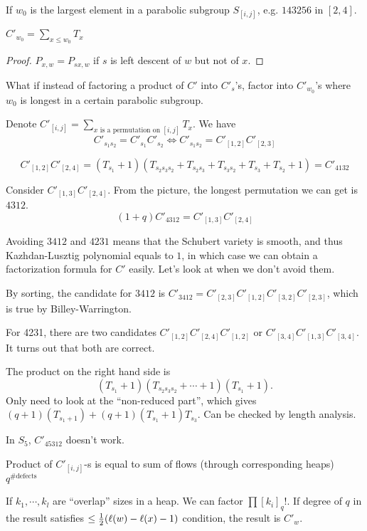 If $w_0$ is the largest element in a parabolic subgroup $S_{[i,j]}$, e.g. $143256$ in $[2,4]$.

\begin{prop}
	$C'_{w_0}=\sum_{x\leq w_0}T_x$
\end{prop}
\begin{proof}
	$P_{x,w} = P_{sx,w}$ if $s$ is left descent of $w$ but not of $x$.
\end{proof}

What if instead of factoring a product of $C'$ into $C'_s$'s, factor into $C'_{w_0}$'s where $w_0$ is longest in a certain parabolic subgroup.

Denote $C'_{[i,j]}=\sum_{x\text{ is a permutation on }[i,j]}T_x$.
We have 
\[C'_{s_1s_2} = C'_{s_1}C'_{s_2}\iff C'_{s_1s_2}=C'_{[1,2]}C'_{[2,3]}\]
\begin{example}
	\[C'_{[1,2]}C'_{[2,4]}=(T_{s_1}+1)(T_{s_2s_3s_2}+T_{s_2s_3}+T_{s_3s_2}+T_{s_3}+T_{s_2}+1)=C'_{4132}\]
\end{example}
\begin{example}
	Consider $C'_{[1,3]}C'_{[2,4]}$. From the picture, the longest permutation we can get is $4312$.
	$$(1+q)C'_{4312}=C'_{[1,3]}C'_{[2,4]}$$
\end{example}
Avoiding $3412$ and $4231$ means that the Schubert variety is smooth, and thus Kazhdan-Lusztig polynomial equals to $1$, in which case we can obtain a factorization formula for $C'$ easily. Let's look at when we don't avoid them.
\begin{example} By sorting, the candidate for $3412$ is
	 $C'_{3412}=C'_{[2,3]}C'_{[1,2]}C'_{[3,2]}C'_{[2,3]}$, which is true by Billey-Warrington.
	 
	 For 4231, there are two candidates $C'_{[1,2]}C'_{[2,4]}C'_{[1,2]}$ or $C'_{[3,4]}C'_{[1,3]}C'_{[3,4]}$. It turns out that both are correct.
	 
	 The product on the right hand side is
	 \[(T_{s_1}+1)(T_{s_2s_3s_2}+\cdots+1)(T_{s_1}+1).\]
	 Only need to look at the ``non-reduced part'', which gives $(q+1)(T_{s_1+1})+(q+1)(T_{s_1}+1)T_{s_3}$. Can be checked by length analysis.
\end{example}
\begin{example}
	In $S_5$, $C'_{45312}$ doesn't work.
\end{example}
\begin{theorem}
	Product of $C'_{[i,j]}$-s is equal to sum of flows (through corresponding heaps) $q^{\#\text{defects}}$
\end{theorem}

\begin{theorem}
	If $k_1,\cdots,k_l$ are ``overlap'' sizes in a heap. We can factor $\prod[k_i]_q!$. If degree of $q$ in the result satisfies $\leq {1\over 2}(\ell(w)-\ell(x)-1)$ condition, the result is $C'_w$.
\end{theorem}
